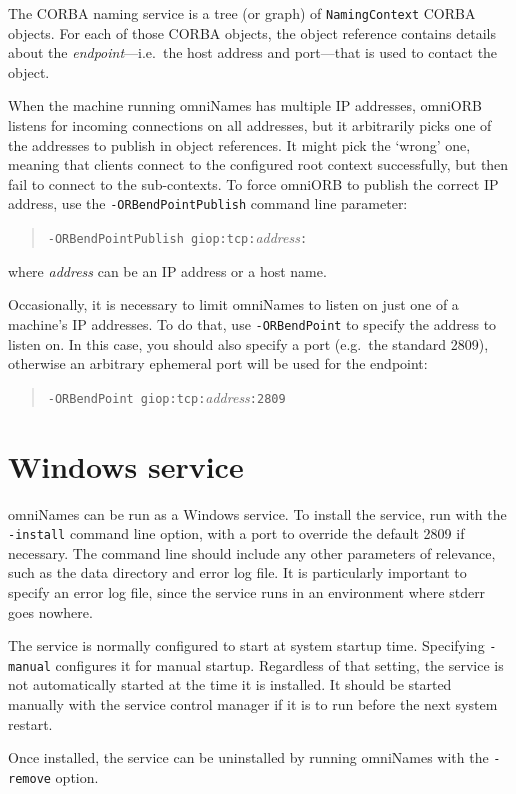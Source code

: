 \documentclass[a4paper,11pt]{article}
\newcommand{\cmdline}[1]{\texttt{#1}}
\newcommand{\code}[1]{\texttt{#1}}
\begin{document}
The CORBA naming service is a tree (or graph) of \code{NamingContext}
CORBA objects. For each of those CORBA objects, the object reference
contains details about the \emph{endpoint}---i.e.\ the host address
and port---that is used to contact the object.

When the machine running omniNames has multiple IP addresses, omniORB
listens for incoming connections on all addresses, but it arbitrarily
picks one of the addresses to publish in object references. It might
pick the `wrong' one, meaning that clients connect to the configured
root context successfully, but then fail to connect to the
sub-contexts. To force omniORB to publish the correct IP address, use
the \cmdline{-ORBendPointPublish} command line parameter:

\begin{quote}
\cmdline{-ORBendPointPublish giop:tcp:}\textit{address}\cmdline{:}
\end{quote}

\noindent where \textit{address} can be an IP address or a host name.

Occasionally, it is necessary to limit omniNames to listen on just one
of a machine's IP addresses. To do that, use \cmdline{-ORBendPoint} to
specify the address to listen on. In this case, you should also
specify a port (e.g.\ the standard 2809), otherwise an arbitrary
ephemeral port will be used for the endpoint:

\begin{quote}
\cmdline{-ORBendPoint giop:tcp:}\textit{address}\cmdline{:2809}
\end{quote}


\section{Windows service}

omniNames can be run as a Windows service. To install the service, run
with the \cmdline{-install} command line option, with a port to
override the default 2809 if necessary. The command line should
include any other parameters of relevance, such as the data directory
and error log file. It is particularly important to specify an error
log file, since the service runs in an environment where stderr goes
nowhere.

The service is normally configured to start at system startup time.
Specifying \cmdline{-manual} configures it for manual startup.
Regardless of that setting, the service is not automatically started
at the time it is installed. It should be started manually with the
service control manager if it is to run before the next system
restart.

Once installed, the service can be uninstalled by running omniNames
with the \cmdline{-remove} option.
\end{document}
